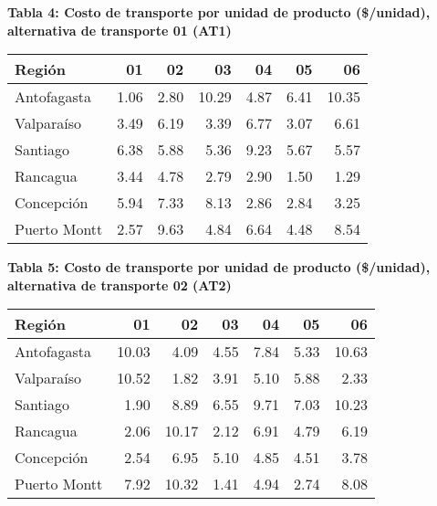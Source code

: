 \documentclass[a4paper]{article}
\begin{document}
        \textbf{Tabla 4: Costo de transporte por unidad de producto (\$/unidad), alternativa de transporte 01 (AT1)}
        \begin{center}
            \begin{tabular}{|l|r|r|r|r|r|r|}
                \hline
                Región & 01 & 02 & 03 & 04 & 05 & 06 \\
                \hline
                Antofagasta  & 1.06 & 2.80 & 10.29 & 4.87 & 6.41 & 10.35 \\
                Valparaíso   & 3.49 & 6.19 & 3.39  & 6.77 & 3.07 & 6.61  \\
                Santiago     & 6.38 & 5.88 & 5.36  & 9.23 & 5.67 & 5.57  \\
                Rancagua     & 3.44 & 4.78 & 2.79  & 2.90 & 1.50 & 1.29  \\
                Concepción   & 5.94 & 7.33 & 8.13  & 2.86 & 2.84 & 3.25  \\
                Puerto Montt & 2.57 & 9.63 & 4.84  & 6.64 & 4.48 & 8.54  \\
                \hline
            \end{tabular}
        \end{center}
        
        \vspace{0.5cm}
        
        \textbf{Tabla 5: Costo de transporte por unidad de producto (\$/unidad), alternativa de transporte 02 (AT2)}
        \begin{center}
            \begin{tabular}{|l|r|r|r|r|r|r|}
                \hline
                Región & 01 & 02 & 03 & 04 & 05 & 06 \\
                \hline
                Antofagasta  & 10.03 & 4.09 & 4.55  & 7.84 & 5.33 & 10.63 \\
                Valparaíso   & 10.52 & 1.82 & 3.91  & 5.10 & 5.88 & 2.33  \\
                Santiago     & 1.90  & 8.89 & 6.55  & 9.71 & 7.03 & 10.23 \\
                Rancagua     & 2.06  & 10.17 & 2.12 & 6.91 & 4.79 & 6.19  \\
                Concepción   & 2.54  & 6.95 & 5.10  & 4.85 & 4.51 & 3.78  \\
                Puerto Montt & 7.92  & 10.32 & 1.41 & 4.94 & 2.74 & 8.08  \\
                \hline
            \end{tabular}
        \end{center}
\end{document}

